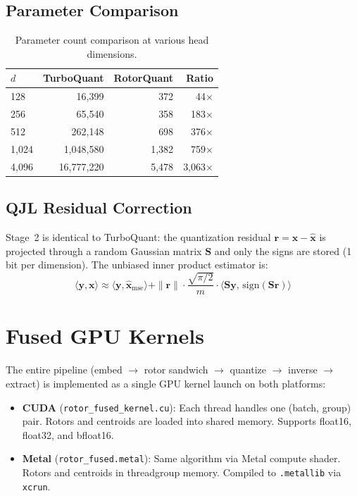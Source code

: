 \documentclass[10pt,twocolumn]{article}
\begin{document}
\subsection{Parameter Comparison}

\begin{table}[h]
\centering
\caption{Parameter count comparison at various head dimensions.}
\label{tab:params}
\begin{tabular}{@{}lrrr@{}}
\toprule
$d$ & TurboQuant & RotorQuant & Ratio \\
\midrule
128 & 16,399 & 372 & 44$\times$ \\
256 & 65,540 & 358 & 183$\times$ \\
512 & 262,148 & 698 & 376$\times$ \\
1,024 & 1,048,580 & 1,382 & 759$\times$ \\
4,096 & 16,777,220 & 5,478 & 3,063$\times$ \\
\bottomrule
\end{tabular}
\end{table}

\subsection{QJL Residual Correction}

Stage~2 is identical to TurboQuant: the quantization residual $\mathbf{r} = \mathbf{x} - \hat{\mathbf{x}}$ is projected through a random Gaussian matrix $\mathbf{S}$ and only the signs are stored (1 bit per dimension).
The unbiased inner product estimator is:
\begin{equation}
  \langle \mathbf{y}, \mathbf{x} \rangle \approx \langle \mathbf{y}, \hat{\mathbf{x}}_{\text{mse}} \rangle + \|\mathbf{r}\| \cdot \frac{\sqrt{\pi/2}}{m} \cdot \langle \mathbf{S}\mathbf{y},\, \text{sign}(\mathbf{S}\mathbf{r}) \rangle
\end{equation}

\section{Fused GPU Kernels}
\label{sec:kernels}

The entire pipeline (embed $\to$ rotor sandwich $\to$ quantize $\to$ inverse $\to$ extract) is implemented as a single GPU kernel launch on both platforms:

\begin{itemize}[nosep]
  \item \textbf{CUDA} (\texttt{rotor\_fused\_kernel.cu}): Each thread handles one (batch, group) pair. Rotors and centroids are loaded into shared memory. Supports float16, float32, and bfloat16.
  \item \textbf{Metal} (\texttt{rotor\_fused.metal}): Same algorithm via Metal compute shader. Rotors and centroids in threadgroup memory. Compiled to \texttt{.metallib} via \texttt{xcrun}.
\end{itemize}
\end{document}
